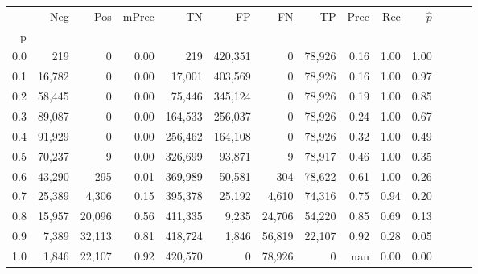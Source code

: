 \begin{tabular}{rrrrrrrrrrrrrr}
\toprule
{} &     Neg &     Pos & mPrec &       TN &       FP &      FN &      TP &  Prec &   Rec & $\hat{p}$ \\
p   &         &         &       &          &          &         &         &       &       &           \\
\midrule
0.0 &     219 &       0 &  0.00 &      219 &  420,351 &       0 &  78,926 &  0.16 &  1.00 &      1.00 \\
0.1 &  16,782 &       0 &  0.00 &   17,001 &  403,569 &       0 &  78,926 &  0.16 &  1.00 &      0.97 \\
0.2 &  58,445 &       0 &  0.00 &   75,446 &  345,124 &       0 &  78,926 &  0.19 &  1.00 &      0.85 \\
0.3 &  89,087 &       0 &  0.00 &  164,533 &  256,037 &       0 &  78,926 &  0.24 &  1.00 &      0.67 \\
0.4 &  91,929 &       0 &  0.00 &  256,462 &  164,108 &       0 &  78,926 &  0.32 &  1.00 &      0.49 \\
0.5 &  70,237 &       9 &  0.00 &  326,699 &   93,871 &       9 &  78,917 &  0.46 &  1.00 &      0.35 \\
0.6 &  43,290 &     295 &  0.01 &  369,989 &   50,581 &     304 &  78,622 &  0.61 &  1.00 &      0.26 \\
0.7 &  25,389 &   4,306 &  0.15 &  395,378 &   25,192 &   4,610 &  74,316 &  0.75 &  0.94 &      0.20 \\
0.8 &  15,957 &  20,096 &  0.56 &  411,335 &    9,235 &  24,706 &  54,220 &  0.85 &  0.69 &      0.13 \\
0.9 &   7,389 &  32,113 &  0.81 &  418,724 &    1,846 &  56,819 &  22,107 &  0.92 &  0.28 &      0.05 \\
1.0 &   1,846 &  22,107 &  0.92 &  420,570 &        0 &  78,926 &       0 &   nan &  0.00 &      0.00 \\
\bottomrule
\end{tabular}
